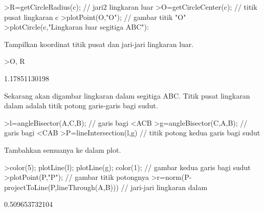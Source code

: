 \documentclass[a4paper,10pt]{article}
\begin{document}
\begin{eulernotebook}
\begin{eulercomment}
\begin{eulercomment}
\begin{eulercomment}
\begin{eulercomment}
\begin{eulercomment}
\begin{eulercomment}
\begin{eulercomment}
\begin{eulercomment}
\begin{eulercomment}
\begin{eulercomment}
\begin{eulercomment}
\begin{eulercomment}
\begin{eulercomment}
\begin{eulercomment}
\begin{eulercomment}
\begin{eulercomment}
\begin{eulercomment}
\begin{eulercomment}
\begin{eulercomment}
\begin{eulercomment}
\begin{eulercomment}
\begin{eulercomment}
\begin{eulercomment}
\begin{eulercomment}
\begin{eulercomment}
\begin{eulercomment}
\begin{eulercomment}
\begin{eulercomment}
\begin{eulercomment}
\begin{eulercomment}
\begin{eulerprompt}
>R=getCircleRadius(c); // jari2 lingkaran luar 
>O=getCircleCenter(c); // titik pusat lingkaran c 
>plotPoint(O,"O"); // gambar titik "O"
>plotCircle(c,"Lingkaran luar segitiga ABC"):
\end{eulerprompt}
\begin{eulercomment}
Tampilkan koordinat titik pusat dan jari-jari lingkaran luar.
\end{eulercomment}
\begin{eulerprompt}
>O, R
\end{eulerprompt}
\begin{euleroutput}
  [1.16667,  1.16667]
  1.17851130198
\end{euleroutput}
\begin{eulercomment}
Sekarang akan digambar lingkaran dalam segitiga ABC. Titik pusat
lingkaran dalam adalah titik potong garis-garis bagi sudut.
\end{eulercomment}
\begin{eulerprompt}
>l=angleBisector(A,C,B); // garis bagi <ACB
>g=angleBisector(C,A,B); // garis bagi <CAB
>P=lineIntersection(l,g) // titik potong kedua garis bagi sudut
\end{eulerprompt}
\begin{euleroutput}
  [0.86038,  0.86038]
\end{euleroutput}
\begin{eulercomment}
Tambahkan semuanya ke dalam plot.
\end{eulercomment}
\begin{eulerprompt}
>color(5); plotLine(l); plotLine(g); color(1); // gambar kedua garis bagi sudut
>plotPoint(P,"P"); // gambar titik potongnya
>r=norm(P-projectToLine(P,lineThrough(A,B))) // jari-jari lingkaran dalam
\end{eulerprompt}
\begin{euleroutput}
  0.509653732104
\end{euleroutput}
\begin{eulerprompt}

\end{eulerprompt}
\end{eulercomment}
\end{eulercomment}
\end{eulercomment}
\end{eulercomment}
\end{eulercomment}
\end{eulercomment}
\end{eulercomment}
\end{eulercomment}
\end{eulercomment}
\end{eulercomment}
\end{eulercomment}
\end{eulercomment}
\end{eulercomment}
\end{eulercomment}
\end{eulercomment}
\end{eulercomment}
\end{eulercomment}
\end{eulercomment}
\end{eulercomment}
\end{eulercomment}
\end{eulercomment}
\end{eulercomment}
\end{eulercomment}
\end{eulercomment}
\end{eulercomment}
\end{eulercomment}
\end{eulercomment}
\end{eulercomment}
\end{eulercomment}
\end{eulercomment}
\end{eulernotebook}
\end{document}

